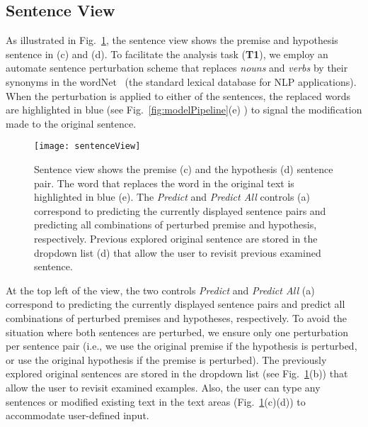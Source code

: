 \subsection{Sentence View}
\label{sec:sentence}
As illustrated in Fig.~\ref{fig:sentenceView}, the sentence view shows the premise and hypothesis sentence in (c) and (d).
%
To facilitate the analysis task (\textbf{T1}), we employ an automate sentence perturbation scheme that replaces \emph{nouns} and \emph{verbs} by their synonyms in the wordNet~\cite{Miller1995} (the standard lexical database for NLP applications).
%
When the perturbation is applied to either of the sentences, the replaced words are highlighted in blue (see Fig.~\ref{fig:modelPipeline}(e) ) to signal the modification made to the original sentence.

\begin{figure}[htbp]
\centering
\vspace{-2mm}
 \texttt{[image: sentenceView]}
 \vspace{-2mm}
 \caption{
 Sentence view shows the premise (c) and the hypothesis (d) sentence pair. The word that replaces the word in the original text is highlighted in blue (e).
 The \emph{Predict} and \emph{Predict All} controls (a) correspond to predicting the currently displayed sentence pairs and predicting all combinations of perturbed premise and hypothesis, respectively.
 Previous explored original sentence are stored in the dropdown list (d) that allow the user to revisit previous examined sentence.
}
\label{fig:sentenceView}
\end{figure}

At the top left of the view, the two controls \emph{Predict} and \emph{Predict All} (a) correspond to predicting the currently displayed sentence pairs and predict all combinations of perturbed premises and hypotheses, respectively.
%
To avoid the situation where both sentences are perturbed, we ensure only one perturbation per sentence pair (i.e., we use the original premise if the hypothesis is perturbed, or use the original hypothesis if the premise is perturbed).
The previously explored original sentences are stored in the dropdown list (see Fig.~\ref{fig:sentenceView}(b)) that allow the user to revisit examined examples.
Also, the user can type any sentences or modified existing text in the text areas (Fig.~\ref{fig:sentenceView}(c)(d)) to accommodate user-defined input.



